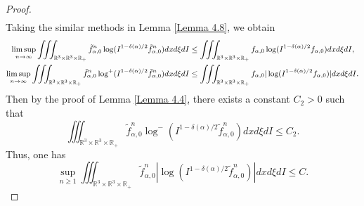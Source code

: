 \documentclass[reqno,11pt]{amsart}
\numberwithin{equation}{section}
\def\R{\mathbb{R}}
\begin{document}
\begin{proof}
\begin{equation*}
{\begin{aligned}
		\end{aligned}}
	\end{equation*}
	Taking the similar methods in Lemma \ref{Lemma 4.8}, we obtain
	\begin{equation}\label{fn0}{\small
		\begin{aligned}
			\limsup \limits_{n\rightarrow \infty } \iiint_{\R^3 \times \R^3 \times \R_+ } \tilde{f}^n_{\alpha,0 } \log ( I^{1 - \delta (\alpha) /2} \tilde{f}^n_{\alpha,0 } ) dxd\xi dI &\leq \iiint_{\R^3 \times \R^3 \times \R_+ } f_{\alpha,0 } \log ( I^{1 - \delta (\alpha) /2} f_{\alpha,0 } ) dxd\xi dI, \\
		\limsup \limits_{n\rightarrow \infty } \iiint_{\R^3 \times \R^3 \times \R_+ } \tilde{f}^n_{\alpha,0 } \log ^+ ( I^{1 - \delta (\alpha) /2} \tilde{f}^n_{\alpha,0 } ) dxd\xi dI &\leq \iiint_{\R^3 \times \R^3 \times \R_+ } f_{\alpha,0 } |\log ( I^{1 - \delta (\alpha) /2} f_{\alpha,0 } ) | dxd\xi dI.
		\end{aligned}}
	\end{equation}
	Then by the proof of Lemma \ref{Lemma 4.4}, there exists a constant $C_2>0$ such that
\begin{equation*}
\iiint_{\R^3 \times \R^3 \times \R_+ } \tilde{f}^n_{\alpha,0 } \log ^-(I^{1-\delta (\alpha)/2}\tilde{f}^n_{\alpha,0 })dxd\xi dI\leq C_2.
\end{equation*}
Thus, one has
\begin{equation}\label{fn-log-bd}
  \sup \limits_{n \geq 1}   \iiint_{\R^3 \times \R^3 \times \R_+ } \tilde{f}^n_{\alpha,0 } |\log (I^{1-\delta (\alpha)/2}\tilde{f}^n_{\alpha,0 })|dxd\xi dI\leq C.
\end{equation}


\end{proof}
\end{document}
